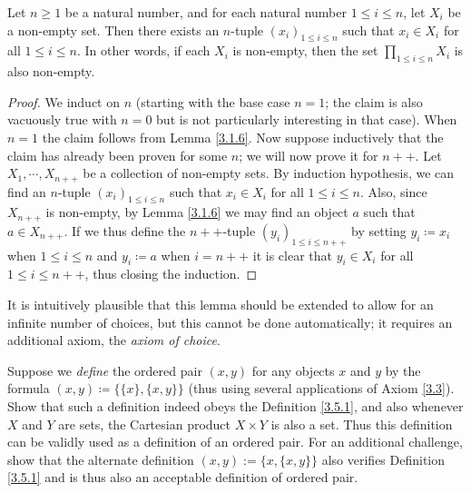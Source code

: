 \setcounter{theorem}{11}
\begin{lemma}\label{3.5.12}
Let \(n \geq 1\) be a natural number, and for each natural number \(1 \leq i \leq n\), let \(X_i\) be a non-empty set.
Then there exists an \(n\)-tuple \((x_i)_{1 \leq i \leq n}\) such that \(x_i \in X_i\) for all \(1 \leq i \leq n\).
In other words, if each \(X_i\) is non-empty, then the set \(\prod_{1 \leq i \leq n} X_i\) is also non-empty.
\end{lemma}

\begin{proof}
We induct on \(n\) (starting with the base case \(n = 1\); the claim is also vacuously true with \(n = 0\) but is not particularly interesting in that case).
When \(n = 1\) the claim follows from Lemma \ref{3.1.6}.
Now suppose inductively that the claim has already been proven for some \(n\);
we will now prove it for \(n++\).
Let \(X_1, \cdots, X_{n++}\) be a collection of non-empty sets.
By induction hypothesis, we can find an \(n\)-tuple \((x_i)_{1 \leq i \leq n}\) such that \(x_i \in X_i\) for all \(1 \leq i \leq n\).
Also, since \(X_{n++}\) is non-empty, by Lemma \ref{3.1.6} we may find an object \(a\) such that \(a \in X_{n++}\).
If we thus define the \(n++\)-tuple \((y_i)_{1 \leq i \leq n++}\) by setting \(y_i \coloneqq x_i\) when \(1 \leq i \leq n\) and \(y_i \coloneqq a\) when \(i = n++\) it is clear that \(y_i \in X_i\) for all \(1 \leq i \leq n++\), thus closing the induction.
\end{proof}

\begin{remark}\label{3.5.13}
It is intuitively plausible that this lemma should be extended to allow for an infinite number of choices, but this cannot be done automatically;
it requires an additional axiom, the \emph{axiom of choice}.
\end{remark}

\exercisesection

\begin{exercise}\label{ex 3.5.1}
Suppose we \emph{define} the ordered pair \((x, y)\) for any objects \(x\) and \(y\) by the formula \((x, y) \coloneqq \{\{x\}, \{x, y\}\}\)
(thus using several applications of Axiom \ref{3.3}).
Show that such a definition indeed obeys the Definition \ref{3.5.1}, and also whenever \(X\) and \(Y\) are sets, the Cartesian product \(X \times Y\) is also a set.
Thus this definition can be validly used as a definition of an ordered pair.
For an additional challenge, show that the alternate definition \((x, y) := \{x, \{x, y\}\}\) also verifies Definition \ref{3.5.1} and is thus also an acceptable definition of ordered pair.
\end{exercise}

